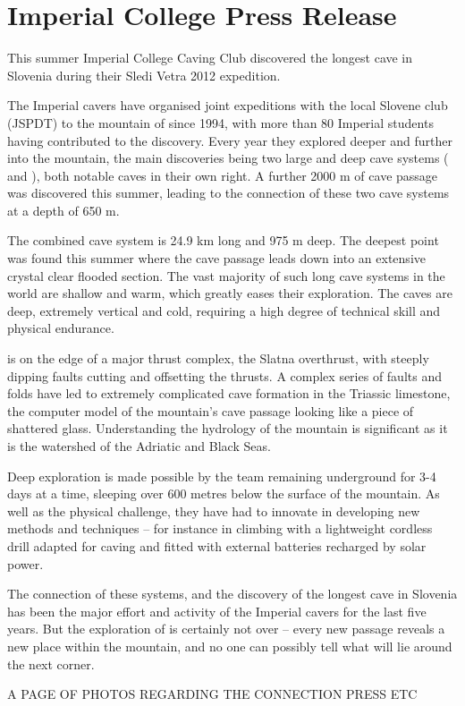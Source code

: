 \section{Imperial College Press Release}

This summer Imperial College Caving Club discovered the longest cave in Slovenia during their Sledi Vetra 2012 expedition.

The Imperial cavers have organised joint expeditions with the local Slovene club (JSPDT) to the mountain of  since 1994, with more than 80 Imperial students having contributed to the discovery. Every year they explored deeper and further into the mountain, the main discoveries being two large and deep cave systems ( and ), both notable caves in their own right. A further 2000 m of cave passage was discovered this summer, leading to the connection of these two cave systems at a depth of 650 m.

The combined cave system is 24.9 km long and 975 m deep. The deepest point was found this summer where the cave passage leads down into an extensive crystal clear flooded section. The vast majority of such long cave systems in the world are shallow and warm, which greatly eases their exploration. The  caves are deep, extremely vertical and cold, requiring a high degree of technical skill and physical endurance.

 is on the edge of a major thrust complex, the Slatna overthrust, with steeply dipping faults cutting and offsetting the thrusts. A complex series of faults and folds have led to extremely complicated cave formation in the Triassic limestone, the computer model of the mountain’s cave passage looking like a piece of shattered glass. Understanding the hydrology of the mountain is significant as it is the watershed of the Adriatic and Black Seas.

Deep exploration is made possible by the team remaining underground for 3-4 days at a time, sleeping over 600 metres below the surface of the mountain. As well as the physical challenge, they have had to innovate in developing new methods and techniques – for instance in climbing with a lightweight cordless drill adapted for caving and fitted with external batteries recharged by solar power.

The connection of these systems, and the discovery of the longest cave in Slovenia has been the major effort and activity of the Imperial cavers for the last five years. But the exploration of  is certainly not over – every new passage reveals a new place within the mountain, and no one can possibly tell what will lie around the next corner.

\newpage

A PAGE OF PHOTOS REGARDING THE CONNECTION PRESS ETC

